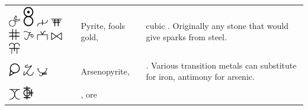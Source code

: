 \documentclass[british,final,landscape]{scrartcl}
\begin{document}
\begin{refsection}
\begin{supertabular}{p{0.3\textwidth}p{0.34\textwidth}p{0.34\textwidth}}
   \includegraphics[width=5mm]{Mineral/Pyrite} \includegraphics[width=5mm]{Mineral/Pyrite2} \includegraphics[width=5mm]{Mineral/Pyrite3} \includegraphics[width=5mm]{Mineral/Pyrite4} \includegraphics[width=5mm]{Mineral/Pyrite5} \includegraphics[width=5mm]{Mineral/Pyrite6} \includegraphics[width=5mm]{Mineral/Pyrite7} \includegraphics[width=5mm]{Mineral/Pyrite8} \includegraphics[width=5mm]{Mineral/Pyrite9} & Pyrite, fools gold,  & cubic . Originally any stone that would give sparks from steel. \\
   \includegraphics[width=5mm]{Mineral/Arsenopyrit} \includegraphics[width=5mm]{Mineral/Arsenopyrit2} \includegraphics[width=5mm]{Mineral/Arsenopyrit3} & Arsenopyrite,  & . Various transition metals can substitute for iron, antimony for arsenic. \\
   \includegraphics[width=5mm]{Mineral/Minera} \includegraphics[width=5mm]{Mineral/Minera2} & , ore & \\

\end{supertabular}
\end{refsection}
\end{document}
